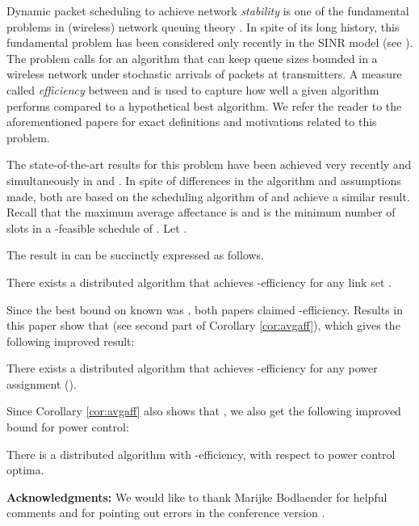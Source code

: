 \documentclass[11pt]{amsart}
\begin{document}
Dynamic packet scheduling to achieve network \emph{stability} is one of the fundamental problems in (wireless) network
queuing theory \cite{TE92}. In spite of its long history, this
fundamental problem has been considered only recently in the SINR model 
(see \cite{lqfmobihoc,kesselheimStability,sirocco12}). The problem calls for an algorithm that can keep queue sizes bounded in a wireless network under stochastic arrivals of packets at transmitters. A measure called \emph{efficiency} between  and  is used to capture how well a given algorithm performs compared to a hypothetical best algorithm. We refer the reader to the aforementioned papers for exact definitions and motivations related to this problem.

The state-of-the-art results for this problem have been achieved very recently and simultaneously in \cite{sirocco12} and \cite{kesselheimStability}. In spite of differences in the algorithm  and assumptions made, both are based on the scheduling
algorithm of \cite{KV10} and achieve a similar result. Recall that the maximum average affectance is  and  is the minimum number of slots in a -feasible schedule of . Let . 



The result in \cite{kesselheimStability,sirocco12} can be succinctly expressed as follows.


\begin{theorem}{\cite{kesselheimStability,sirocco12}}
There exists a distributed algorithm that achieves -efficiency for any link set . 
\end{theorem}
Since the best bound on  known was  \cite{KV10}, both papers claimed -efficiency. Results in this paper show that  (see second part of Corollary \ref{cor:avgaff}), which gives the following improved result:

\begin{corollary}
There exists a distributed algorithm that achieves -efficiency for any power assignment  (). 
\end{corollary}



Since Corollary \ref{cor:avgaff} also shows that , we also get the following improved bound
for power control:
\begin{corollary}
There is a distributed algorithm with -efficiency, with respect to power control optima.
\end{corollary}

\textbf{Acknowledgments:} We would like to thank Marijke Bodlaender for helpful comments and for pointing out errors in the conference version \cite{us:SODA13}.
 
\end{document}
